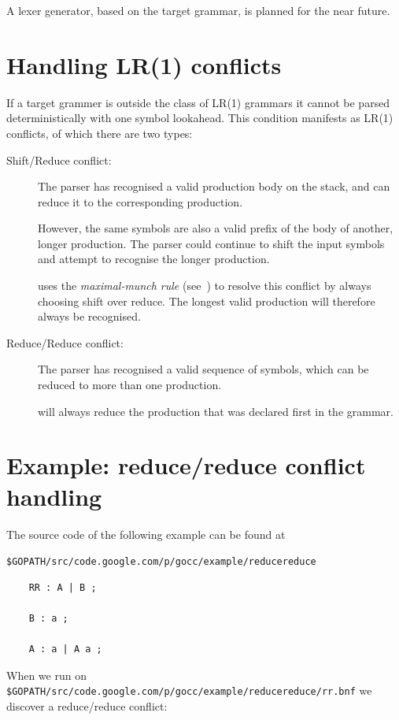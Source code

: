 \documentclass[12pt]{article}
\begin{document}
	A lexer generator, based on the target grammar, is planned for the near future.

\section{Handling LR(1) conflicts} \label{sec:lr conflicts}
	If a target grammer is outside the class of LR(1) grammars it cannot be parsed deterministically with one symbol lookahead. This condition manifests as LR(1) conflicts, of which there are two types:

	\begin{description}
		\item[Shift/Reduce conflict:] The parser has recognised a valid production body on the stack, and can reduce it to the corresponding production. 

		However, the same symbols are also a valid prefix of the body of another, longer production. The parser could continue to shift the input symbols and attempt to recognise the longer production.

		\gocc uses the {\em maximal-munch rule} (see~\cite{Modern Compiler Design}) to resolve this conflict by always choosing shift over reduce. The longest valid production will therefore always be recognised.

		\item[Reduce/Reduce conflict:] The parser has recognised a valid sequence of symbols, which can be reduced to more than one production.

		\gocc will always reduce the production that was declared first in the grammar.
	\end{description}

\section{Example: reduce/reduce conflict handling} \label{sec:example rr}
	The source code of the following example can be found at

	\verb|$GOPATH/src/code.google.com/p/gocc/example/reducereduce|

	\begin{verbatim}
	RR : A | B ;

	B : a ;

	A : a | A a ;

	\end{verbatim}

	When we run \gocc on \verb|$GOPATH/src/code.google.com/p/gocc/example/reducereduce/rr.bnf| we discover a reduce/reduce conflict:
\end{document}
